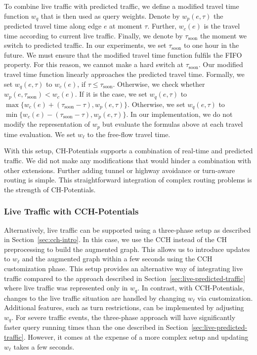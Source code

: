 \documentclass[manuscript,review]{acmart}
\begin{document}
To combine live traffic with predicted traffic, we define a modified travel time function $w_q$ that is then used as query weights.
Denote by $w_p(e,\tau)$ the predicted travel time along edge $e$ at moment $\tau$.
Further, $w_c(e)$ is the travel time according to current live traffic.
Finally, we denote by $\tau_{\mathrm{soon}}$ the moment we switch to predicted traffic.
In our experiments, we set $\tau_{\mathrm{soon}}$ to one hour in the future.
We must ensure that the modified travel time function fulfils the FIFO property.
For this reason, we cannot make a hard switch at $\tau_{\mathrm{soon}}$.
Our modified travel time function linearly approaches the predicted travel time. %
%
Formally, we set $w_q(e,\tau)$ to $w_c(e)$, if $\tau \leq \tau_{\mathrm{soon}}$.
Otherwise, we check whether $w_p(e,\tau_{\mathrm{soon}}) < w_c(e)$.
If it is the case, we set $w_q(e,\tau)$ to $\max\{w_c(e)+(\tau_{\mathrm{soon}}-\tau), w_p(e,\tau)\}$.
Otherwise, we set $w_q(e,\tau)$ to $\min\{w_c(e)-(\tau_{\mathrm{soon}}-\tau), w_p(e,\tau)\}$.
In our implementation, we do not modify the representation of $w_p$ but evaluate the formulas above at each travel time evaluation.
We set $w_\ell$ to the free-flow travel time.

With this setup, CH-Potentials supports a combination of real-time and predicted traffic.
We did not make any modifications that would hinder a combination with other extensions.
Further adding tunnel or highway avoidance or turn-aware routing is simple.
This straightforward integration of complex routing problems is the strength of CH-Potentials.

\subsubsection{Live Traffic with CCH-Potentials}

Alternatively, live traffic can be supported using a three-phase setup as described in Section~\ref{sec:cch-intro}.
In this case, we use the CCH instead of the CH preprocessing to build the augmented graph.
This allows us to introduce updates to $w_\ell$ and the augmented graph within a few seconds using the CCH customization phase.
This setup provides an alternative way of integrating live traffic compared to the approach described in Section~\ref{sec:live-predicted-traffic} where live traffic was represented only in $w_q$.
In contrast, with CCH-Potentials, changes to the live traffic situation are handled by changing $w_\ell$ via customization.
Additional features, such as turn restrictions, can be implemented by adjusting $w_q$.
For severe traffic events, the three-phase approach will have significantly faster query running times than the one described in Section~\ref{sec:live-predicted-traffic}.
However, it comes at the expense of a more complex setup and updating $w_\ell$ takes a few seconds.
\end{document}
